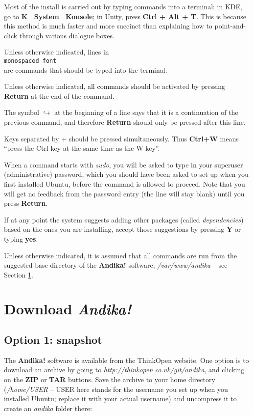 \documentclass[a4paper,10pt]{article}
\begin{document}
Most of the install is carried out by typing commands into a terminal: in KDE, go to \textbf{K \textrightarrow\ System \textrightarrow\ Konsole}; in Unity, press \textbf{Ctrl + Alt + T}.  This is because this method is much faster and more succinct than explaining how to point-and-click through various dialogue boxes.

Unless otherwise indicated, lines in\\
\texttt{monospaced font}\\
are commands that should be typed into the terminal.  

Unless otherwise indicated, all commands should be activated by pressing \textbf{Return} at the end of the command.

The symbol $\hookrightarrow$ at the beginning of a line says that it is a continuation of the previous command, and therefore \textbf{Return} should only be pressed after this line.

Keys separated by + should be pressed simultaneously.  Thus \textbf{Ctrl+W} means ``press the Ctrl key at the same time as the W key''.

When a command starts with \textit{sudo}, you will be asked to type in your superuser (administrative) password, which you should have been asked to set up when you first installed Ubuntu, before the command is allowed to proceed.  Note that you will get no feedback from the password entry (the line will stay blank) until you press \textbf{Return}.

If at any point the system suggests adding other packages (called \textit{dependencies}) based on the ones you are installing, accept those suggestions by pressing \textbf{Y} or typing \textbf{yes}.

Unless otherwise indicated, it is assumed that all commands are run from the suggested base directory of the \textbf{Andika!} software, \textit{/var/www/andika} -- see Section \ref{s:download}.


\section{Download \textit{Andika!}}
\label{s:download}

\subsection{Option 1: snapshot}

The \textbf{Andika!} software is available from the ThinkOpen website.  One option is to download an archive by going to \textit{http://thinkopen.co.uk/git/andika}, and clicking on the \textbf{ZIP} or \textbf{TAR} buttons.  Save the archive to your home directory (\textit{/home/USER} -- USER here stands for the username you set up when you installed Ubuntu; replace it with your actual username) and uncompress it to create an \textit{andika} folder there:
\end{document}
